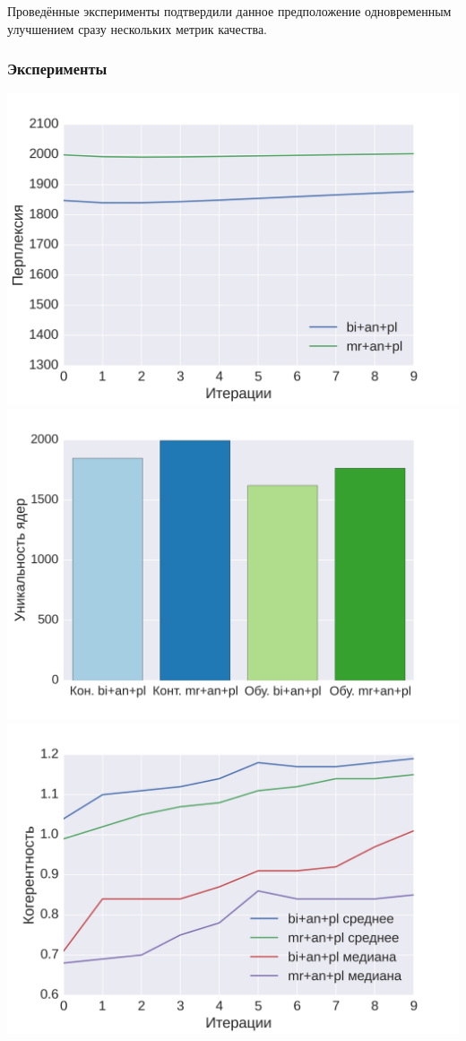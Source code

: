 \documentclass[a4paper, 14pt]{extarticle}
\begin{document}
Проведённые эксперименты подтвердили данное предположение одновременным улучшением сразу нескольких метрик качества.

\subsubsection*{Эксперименты}

\includegraphics[scale=0.43]{img/bi/1}  
\includegraphics[scale=0.43]{img/bi/5}\\
\includegraphics[scale=0.43]{img/bi/3}
\end{document}
